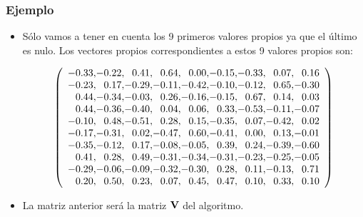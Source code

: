 \begin{frame}
\frametitle{Ejemplo}
\begin{itemize}
\item<2->{Sólo vamos a tener en cuenta los 9 primeros valores propios ya que el último es nulo. Los vectores propios correspondientes a estos 9 valores propios son:
{\tiny\begin{center}
$$
\left(\begin{array}{r@{}r@{}r@{}r@{}r@{}r@{}r@{}r@{}r}
-0.33,  &  -0.22,  &  0.41,  &  0.64,  &  0.00,  &  -0.15,  &  -0.33,  &  0.07,  &  0.16 \\
-0.23,  &  0.17,  &  -0.29,  &  -0.11,  &  -0.42,  &  -0.10,  &  -0.12,  &  0.65,  &  -0.30 \\
0.44,  &  -0.34,  &  -0.03,  &  0.26,  &  -0.16,  &  -0.15,  &  0.67,  &  0.14,  &  0.03 \\
0.44,  &  -0.36,  &  -0.40,  &  0.04,  &  0.06,  &  0.33,  &  -0.53,  &  -0.11,  &  -0.07 \\
-0.10,  &  0.48,  &  -0.51,  &  0.28,  &  0.15,  &  -0.35,  &  0.07,  &  -0.42,  &  0.02 \\
-0.17,  &  -0.31,  &  0.02,  &  -0.47,  &  0.60,  &  -0.41,  &  0.00,  &  0.13,  &  -0.01 \\
-0.35,  &  -0.12,  &  0.17,  &  -0.08,  &  -0.05,  &  0.39,  &  0.24,  &  -0.39,  &  -0.60 \\
0.41,  &  0.28,  &  0.49,  &  -0.31,  &  -0.34,  &  -0.31,  &  -0.23,  &  -0.25,  &  -0.05 \\
-0.29,  &  -0.06,  &  -0.09,  &  -0.32,  &  -0.30,  &  0.28,  &  0.11,  &  -0.13,  &  0.71 \\
0.20,  &  0.50,  &  0.23,  &  0.07,  &  0.45,  &  0.47,  &  0.10,  &  0.33,  &  0.10 \\
\end{array}\right)
$$
\end{center}}
}
\item<3->{La matriz anterior será la matriz $\mathbf{V}$ del algoritmo.}
\end{itemize}
\end{frame}
